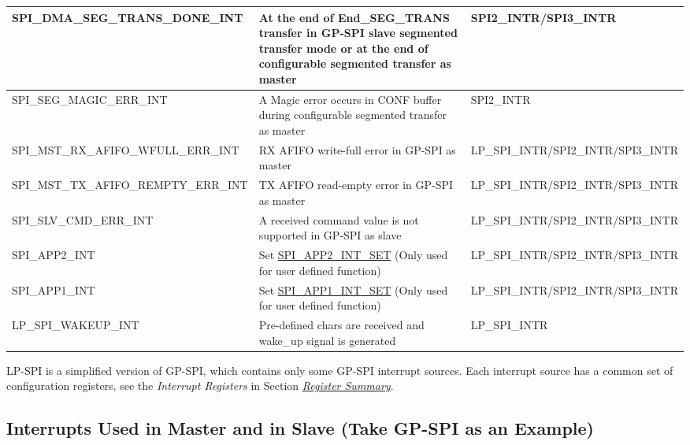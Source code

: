 \documentclass[main\_\_EN.tex]{subfiles}
\begin{document}
\begin{longtable}{ | L{5cm} | L{6.5cm} | L{4cm} | }
\label{int:SPIDMASEGTRANSDONEINT}SPI\_DMA\_SEG\_TRANS\_DONE\newline\_INT & At the end of End\_SEG\_TRANS transfer in GP-SPI slave segmented transfer mode or at the end of configurable segmented transfer as master & SPI2\_INTR/SPI3\_INTR\\ \hline
\label{int:SPISEGMAGICERRINT} SPI\_SEG\_MAGIC\_ERR\_INT & A Magic error occurs in CONF buffer during configurable segmented transfer as master &SPI2\_INTR \\ \hline
\label{int:SPIMSTRXAFIFOWFULLERRINT} SPI\_MST\_RX\_AFIFO\_WFULL\newline\_ERR\_INT & RX AFIFO write-full error in GP-SPI as master & LP\_SPI\_INTR/SPI2\_INTR/\newline SPI3\_INTR\\ \hline
\label{int:SPIMSTTXAFIFOREMPTYERRINT} SPI\_MST\_TX\_AFIFO\_REMPTY\newline\_ERR\_INT &TX AFIFO read-empty error in GP-SPI as master & LP\_SPI\_INTR/SPI2\_INTR/\newline SPI3\_INTR\\ \hline
\label{int:SPISLVCMDERRINT} SPI\_SLV\_CMD\_ERR\_INT & A received command value is not supported in GP-SPI as slave & LP\_SPI\_INTR/SPI2\_INTR/\newline SPI3\_INTR\\ \hline
\label{int:SPIAPP2INT}SPI\_APP2\_INT & Set \hyperref[fielddesc:SPIAPP1INTSET]{SPI\_APP2\_INT\_SET} (Only used for user defined function)& LP\_SPI\_INTR/SPI2\_INTR/\newline SPI3\_INTR\\ \hline
\label{int:SPIAPP1INT}SPI\_APP1\_INT & Set \hyperref[fielddesc:SPIAPP1INTSET]{SPI\_APP1\_INT\_SET} (Only used for user defined function)& LP\_SPI\_INTR/SPI2\_INTR/\newline SPI3\_INTR\\ \hline
\label{int:LPSPIWAKEUPINT} LP\_SPI\_WAKEUP\_INT & Pre-defined chars are received and wake\_up signal is generated & LP\_SPI\_INTR \\ \hline
\end{longtable}

LP-SPI is a simplified version of GP-SPI, which contains only some GP-SPI interrupt sources. Each interrupt source has a common set of configuration registers, see the \textit{Interrupt Registers} in Section \hyperref[sec:spi-reg-summ]{\textit{Register Summary}}.

\subsection{Interrupts Used in Master and in Slave (Take GP-SPI as an Example)}
\end{document}
